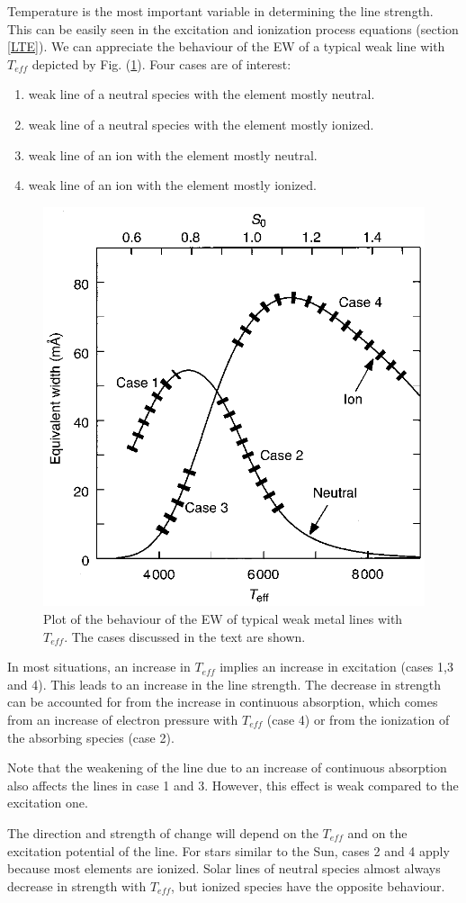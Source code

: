 \documentclass[dvips,12pt,a4paper]{report}
\begin{document}
{Temperature is the most important variable in determining the line strength. This can be easily seen in the excitation and ionization process equations (section \ref{LTE}).
We can appreciate the behaviour of the EW of a typical weak line with $T_{eff}$ depicted by Fig. (\ref{ewdp}). Four cases are of interest:
\begin{enumerate}
 \item weak line of a neutral species with the element mostly neutral.
 \item weak line of a neutral species with the element mostly ionized.
 \item weak line of an ion with the element mostly neutral.
 \item weak line of an ion with the element mostly ionized.
\end{enumerate}
\begin{figure}[h]
\centering
\includegraphics[height=6 cm]{pics/parte2/temperature.eps}
\caption[EW dependence on Temperature and Pressure] {Plot of the behaviour of the EW of typical weak metal lines with $T_{eff}$. The cases discussed in the text are shown.}%
\label{ewdp}
\end{figure}

In most situations, an increase in $T_{eff}$ implies an increase in excitation (cases 1,3 and 4). This leads to an increase in the line strength. The decrease in strength can be accounted for from the increase in continuous absorption, which comes from an increase of electron pressure with $T_{eff}$ (case 4) or from the ionization of the absorbing species (case 2). 

Note that the weakening of the line due to an increase of continuous absorption also affects the lines in case 1 and 3. However, this effect is weak compared to the excitation one.

The direction and strength of change will depend on the $T_{eff}$ and on the excitation potential of the line. For stars similar to the Sun, cases 2 and 4 apply because most elements are ionized. Solar lines of neutral species almost always decrease in strength with $T_{eff}$, but ionized species have the opposite behaviour. 

}
\end{document}
